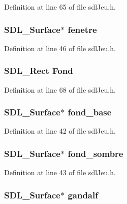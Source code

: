 Definition at line 65 of file sdl\-Jeu.\-h.

\hypertarget{structsdl_jeu_a96eebd19c7cea6af7e50e821d04ed494}{
\subsubsection[{fenetre}]{\setlength{\rightskip}{0pt plus 5cm}S\-D\-L\-\_\-\-Surface$\ast$ fenetre}}\label{structsdl_jeu_a96eebd19c7cea6af7e50e821d04ed494}


Definition at line 46 of file sdl\-Jeu.\-h.

\hypertarget{structsdl_jeu_a61a141b7f826f13b1a404bac31aabe4c}{
\subsubsection[{Fond}]{\setlength{\rightskip}{0pt plus 5cm}S\-D\-L\-\_\-\-Rect Fond}}\label{structsdl_jeu_a61a141b7f826f13b1a404bac31aabe4c}


Definition at line 68 of file sdl\-Jeu.\-h.

\hypertarget{structsdl_jeu_aa4f79a6d22df2ec6768024e745708e2b}{
\subsubsection[{fond\-\_\-base}]{\setlength{\rightskip}{0pt plus 5cm}S\-D\-L\-\_\-\-Surface$\ast$ fond\-\_\-base}}\label{structsdl_jeu_aa4f79a6d22df2ec6768024e745708e2b}


Definition at line 42 of file sdl\-Jeu.\-h.

\hypertarget{structsdl_jeu_a85ab02081c98d07a898482a21e48b56e}{
\subsubsection[{fond\-\_\-sombre}]{\setlength{\rightskip}{0pt plus 5cm}S\-D\-L\-\_\-\-Surface$\ast$ fond\-\_\-sombre}}\label{structsdl_jeu_a85ab02081c98d07a898482a21e48b56e}


Definition at line 43 of file sdl\-Jeu.\-h.

\hypertarget{structsdl_jeu_a0a838f8347a9ea3ab071107815325988}{
\subsubsection[{gandalf}]{\setlength{\rightskip}{0pt plus 5cm}S\-D\-L\-\_\-\-Surface$\ast$ gandalf}}\label{structsdl_jeu_a0a838f8347a9ea3ab071107815325988}


